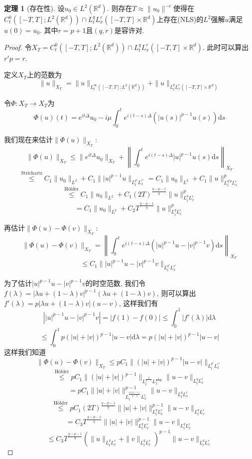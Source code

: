 \documentclass{ctexbook}
\theoremstyle{definition}
\newtheorem{theorem}[definition]{定理}
\theoremstyle{remark}
\newcommand{\dif}{\mathrm{d}}
\begin{document}
\begin{theorem}[存在性]
设$u_0\in L^2(\mathbb{R}^d)$. 则存在$T\approx \|u_0\|^{-c}$使得在$C_t^0([-T,T];L^2(\mathbb{R}^d))\cap L_t^qL_x^r([-T,T]\times\mathbb{R}^d)$上存在(NLS)的$L^2$强解$u$满足$u(0)=u_0$. 其中$r=p+1$且$(q,r)$是容许对.
\end{theorem}
\begin{proof}
令$X_T=C_t^0([-T,T];L^2(\mathbb{R}^d))\cap L_t^qL_x^r([-T,T]\times\mathbb{R}^d)$. 此时可以算出$r'p=r$. 

定义$X_T$上的范数为
$$\|u\|_{X_T}=\|u\|_{L_t^\infty([-T,T];L^2(\mathbb{R}^d))}+\|u\|_{L_t^qL_x^r([-T,T]\times\mathbb{R}^d)}$$

令$\Phi:X_T\rightarrow X_T$为
$$\Phi(u)(t)=e^{it\Delta}u_0-i\mu\int_0^te^{i(t-s)\Delta}(|u(s)|^{p-1}u(s))\dif s$$

我们现在来估计$\|\Phi(u)\|_{X_T}$: 
$$\|\Phi(u)\|_{X_T}\le\|e^{it\Delta}u_0\|_{X_T}+\left\|\int_0^te^{i(t-s)\Delta}|u|^{p-1}u(s)\dif s\right\|_{X_T}$$
$$\overset{\text{Strichartz}}{\le} C_1\|u_0\|_{L^2}+C_1\||u|^{p-1}u\|_{L_t^{q'}L_x^{r'}}=C_1\|u_0\|_{L^2}+C_1\|u\|_{L_t^{q'p}L_x^{r}}^p$$
$$\overset{\text{H\"older}}{\le}C_1\|u_0\|_{L^2}+C_1(2T)^{\frac{q-p-1}{q}}\|u\|_{L_t^{q}L_x^{r}}^p$$
$$=C_1\|u_0\|_{L^2}+C_2T^{\frac{q-p-1}{q}}\|u\|_{L_t^{q}L_x^{r}}^p$$

再估计$\|\Phi(u)-\Phi(v)\|_{X_T}$: 
$$\|\Phi(u)-\Phi(v)\|_{X_T}=\left\|\int_0^te^{i(t-s)\Delta}(|u|^{p-1}u-|v|^{p-1}v)\dif s\right\|_{X_T}$$
$$\le C_1\||u|^{p-1}u-|v|^{p-1}v\|_{L_t^{q'}L_x^{r'}}$$

为了估计$|u|^{p-1}u-|v|^{p-1}v$的时空范数, 我们令$f(\lambda)=|\lambda u+(1-\lambda)v|^{p-1}(\lambda u+(1-\lambda)v)$, 则可以算出$f'(\lambda)=p|\lambda u+(1-\lambda)v|(u-v)$, 这样我们有
$$\left||u|^{p-1}u-|v|^{p-1}v\right|=|f(1)-f(0)|\le\int_0^1|f'(\lambda)|\dif\lambda$$
$$\le\int_0^1p(|u|+|v|)^{p-1}|u-v|\dif\lambda=p(|u|+|v|)^{p-1}|u-v|$$
这样我们知道
$$\|\Phi(u)-\Phi(v)\|_{X_T}\le pC_1\|(|u|+|v|)^{p-1}|u-v|\|_{L_t^{q'}L_x^{r'}}$$
$$\overset{\text{H\"older}}{\le} pC_1\|(|u|+|v|)^{p-1}\|_{L_t^{\frac{q}{q-2}}L_x^{\frac{r}{r-2}}}\|u-v\|_{L_t^qL_x^r}$$
$$=p C_1\||u|+|v|\|_{L_t^{\frac{q(p-1)}{q-2}}L_x^{r}}^{p-1}\|u-v\|_{L_t^qL_x^r}$$
$$\overset{\text{H\"older}}{\le}pC_1(2T)^{\frac{q-p-1}{q}}\||u|+|v|\|_{L_t^qL_x^r}^{p-1}\|u-v\|_{L_t^qL_x^r}$$
$$=C_3T^{\frac{q-p-1}{q}}\||u|+|v|\|_{L_t^qL_x^r}^{p-1}\|u-v\|_{L_t^qL_x^r}$$
$$\le C_3T^{\frac{q-p-1}{q}}\left(\|u\|_{L_t^qL_x^r}+\|v\|_{L_t^qL_x^r}\right)^{p-1}\|u-v\|_{L_t^qL_x^r}$$


\end{proof}
\end{document}
